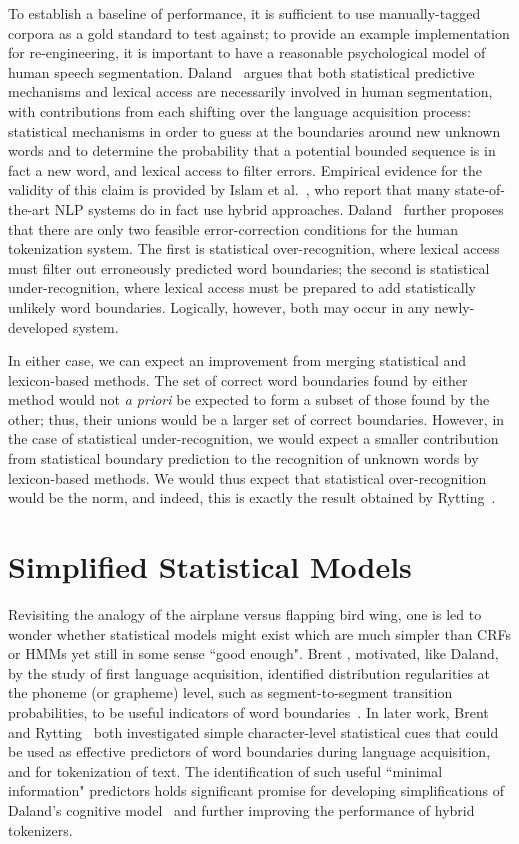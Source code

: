 To establish a baseline of performance, it is sufficient to use manually-tagged corpora as a gold standard to test against; to provide an example implementation for re-engineering, it is important to have a reasonable psychological model of human speech segmentation. Daland~\cite{daland09} argues that both statistical predictive mechanisms and lexical access are necessarily involved in human segmentation, with contributions from each shifting over the language acquisition process: statistical mechanisms in order to guess at the boundaries around new unknown words and to determine the probability that a potential bounded sequence is in fact a new word, and lexical access to filter errors. Empirical evidence for the validity of this claim is provided by Islam et al.~\cite{islam07}, who report that many state-of-the-art NLP systems do in fact use hybrid approaches. Daland~\cite{daland09} further proposes that there are only two feasible error-correction conditions for the human tokenization system. The first is statistical over-recognition, where lexical access must filter out erroneously predicted word boundaries; the second is statistical under-recognition, where lexical access must be prepared to add statistically unlikely word boundaries. Logically, however, both may occur in any newly-developed system.

In either case, we can expect an improvement from merging statistical and lexicon-based methods. The set of correct word boundaries found by either method would not \textit{a priori} be expected to form a subset of those found by the other; thus, their unions would be a larger set of correct boundaries. However, in the case of statistical under-recognition, we would expect a smaller contribution from statistical boundary prediction to the recognition of unknown words by lexicon-based methods. We would thus expect that statistical over-recognition would be the norm, and indeed, this is exactly the result obtained by Rytting~\cite{rytting04}.

\section{Simplified Statistical Models}

Revisiting the analogy of the airplane versus flapping bird wing, one is led to wonder whether statistical models might exist which are much simpler than CRFs or HMMs yet still in some sense ``good enough".  Brent \cite{brent99}, motivated, like Daland, by the study of first language acquisition, identified distribution regularities at the phoneme (or grapheme) level, such as segment-to-segment transition probabilities, to be useful indicators of word boundaries~\cite{brent96}. In later work, Brent~\cite{brent99} and Rytting~\cite{rytting04} both investigated simple character-level statistical cues that could be used as effective predictors of word boundaries during language acquisition, and for tokenization of text. The identification of such useful ``minimal information" predictors holds significant promise for developing simplifications of Daland's cognitive model~\cite{daland09} and further improving the performance of hybrid tokenizers.

